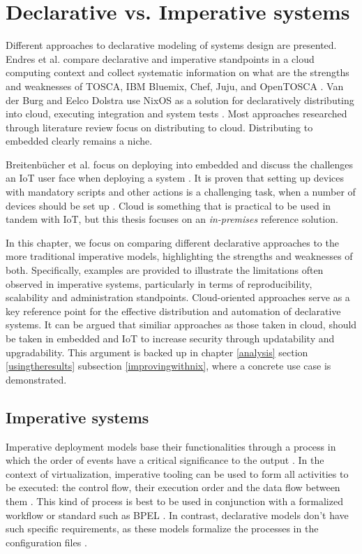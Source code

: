 \chapter{Declarative vs. Imperative systems} \label{imperative}

Different approaches to declarative modeling of
systems design are presented. Endres et al. compare declarative and imperative
standpoints in a cloud computing context and collect systematic
information on what are the strengths and weaknesses of TOSCA, IBM
Bluemix, Chef, Juju, and OpenTOSCA \cite{endres2017declarative}. Van
der Burg and Eelco Dolstra use NixOS as a solution for declaratively
distributing into cloud, executing integration and system tests
\cite{van2010declarative}. Most approaches researched through
literature review focus on distributing to cloud. Distributing to
embedded clearly remains a niche.

Breitenbücher et al. focus on deploying into embedded and discuss
the challenges an IoT user face when deploying a system \cite{breitenbucher2017declarative}. It is proven
that setting up devices with mandatory scripts and other actions is a
challenging task, when a number of devices should be set up \cite{breitenbucher2017declarative}. Cloud is
something that is practical to be used in tandem with IoT, but this thesis
focuses on an \textit{in-premises} reference
solution. 

In this chapter, we focus on comparing different declarative
approaches to the more traditional imperative models, highlighting the
strengths and weaknesses of both. Specifically, examples are provided
to illustrate the limitations often observed in imperative systems,
particularly in terms of reproducibility, scalability and
administration standpoints. Cloud-oriented approaches serve as a key
reference point for the effective distribution and automation of
declarative systems. It can be argued that similiar approaches as
those taken in cloud, should be taken in embedded and IoT to increase
security through updatability and upgradability. This argument is backed up
in chapter \ref{analysis} section \ref{usingtheresults}
subsection \ref{improvingwithnix}, where a concrete use case is demonstrated.

\section{Imperative systems}

Imperative deployment models base their functionalities through a
process in which the order of events have a critical significance to
the output \cite{breitenbucher2017declarative}. In the context of
virtualization, imperative tooling can be used to form all
activities to be executed: the control flow, their execution order
and the data flow between them \cite{endres2017declarative}. This kind
of process is best to be used in conjunction with a formalized
workflow or standard such as BPEL \cite{endres2017declarative}. In
contrast, declarative models don't have such specific requirements, as
these models formalize the processes in the configuration files
\cite{endres2017declarative}.

